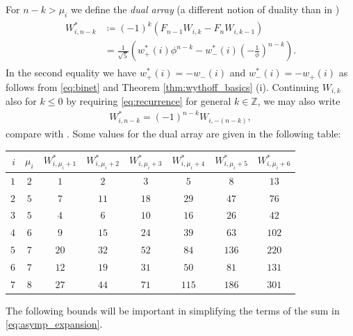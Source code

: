 \documentclass[]{interact}
\newcommand{\bbZ}{\mathbb{Z}}
\theoremstyle{definition}
\numberwithin{table}{section} %
\numberwithin{figure}{section}
\begin{document}
For $n-k > \mu_i$ we define the \emph{dual array} (a different notion of duality %
than in \cite{Kim95})
\begin{align} \label{eq:dual}
    \begin{split}
        W_{i, n-k}^* & \coloneqq (-1)^k (F_{n-1} W_{i, k} - F_n W_{i, k-1}) \\
        & = \frac1{\sqrt5} \left(w_+^*(i) \phi^{n-k} - w_-^*(i) \left(-\frac1\phi\right)^{n-k}\right).
    \end{split}
\end{align}
In the second equality we have $w_+^*(i) = -w_-(i)$ and $w_-^*(i) = -w_+(i)$ as follows from \eqref{eq:binet} and Theorem \ref{thm:wythoff_basics} (i). Continuing $W_{i, k}$ also for $k \leq 0$ by requiring \eqref{eq:recurrence} for general $k \in \bbZ$, we may also write
\begin{align} \label{eq:extension}
    W_{i, n-k}^* = (-1)^{n-k} W_{i, -(n-k)},
\end{align}
compare with \cite{And14}. Some values for the dual array are given in the following table:
\begin{center}
	\begin{tabular}{r||c||c|c|c|c|c|c}
		$i$ & $\mu_i$ & $W^*_{i, \mu_i+1}$ & $W^*_{i, \mu_i+2}$ & $W^*_{i, \mu_i+3}$ & $W^*_{i, \mu_i+4}$ & $W^*_{i, \mu_i+5}$ & $W^*_{i, \mu_i+6}$ \\
		\hline
		$1$ & $2$ & $1$ & $2$ & $3$ & $5$ & $8$ & $13$ \\
		\hline
		$2$ & $5$ & $7$ & $11$ & $18$ & $29$ & $47$ & $76$ \\
		\hline
		$3$ & $5$ & $4$ & $6$ & $10$ & $16$ & $26$ & $42$ \\
		\hline
		$4$ & $6$ & $9$ & $15$ & $24$ & $39$ & $63$ & $102$ \\
		\hline
		$5$ & $7$ & $20$ & $32$ & $52$ & $84$ & $136$ & $220$ \\
		\hline
		$6$ & $7$ & $12$ & $19$ & $31$ & $50$ & $81$ & $131$ \\
		\hline
		$7$ & $8$ & $27$ & $44$ & $71$ & $115$ & $186$ & $301$
	\end{tabular}
\end{center}
The following bounds will be important in simplifying the terms of the sum in \eqref{eq:asymp_expansion}.
\end{document}
